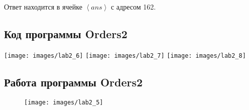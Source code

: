     Ответ находится в ячейке $\left<ans\right>$ с адресом 162.
    \subsection{Код программы Orders2}
    \begin{flushleft}
        \texttt{[image: images/lab2\_6]}
        \newpage
        \texttt{[image: images/lab2\_7]}
        \texttt{[image: images/lab2\_8]}
    \end{flushleft}
    \subsection{Работа программы Orders2}
    \begin{figure}[H]
        \centering
        \texttt{[image: images/lab2\_5]}
        \label{fig:res_2}
    \end{figure}
